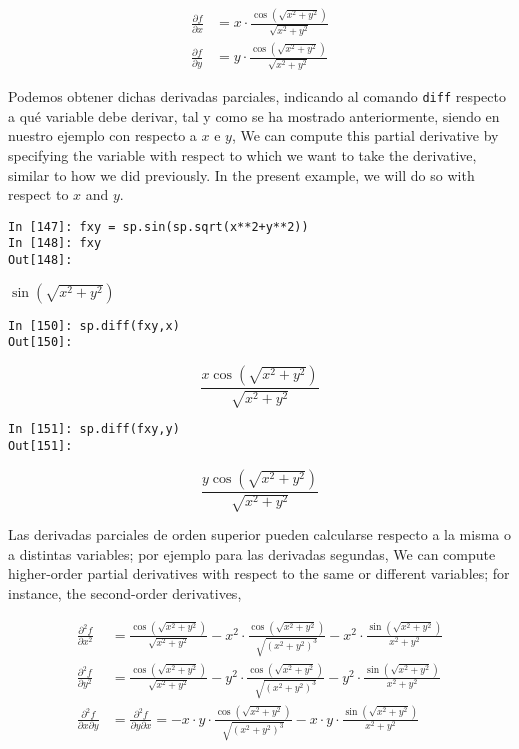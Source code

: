 \begin{align*}
\frac{\partial f}{\partial x} &= x\cdot\frac{\cos(\sqrt{x^2+y^2})}{\sqrt{x^2+y^2}} \\
\frac{\partial f}{\partial y} &= y\cdot\frac{\cos(\sqrt{x^2+y^2})}{\sqrt{x^2+y^2}}
\end{align*}
\begin{paracol}{2}
Podemos obtener dichas derivadas parciales, indicando al comando \texttt{diff} respecto a qué variable debe derivar, tal y como se ha mostrado anteriormente, siendo en nuestro ejemplo con respecto a $x$ e $y$,
\switchcolumn
We can compute this partial derivative by specifying the variable with respect to which we want to take the derivative, similar to how we did previously. In the present example, we will do so with respect to \(x\) and \(y\).  
\end{paracol}
\begin{center}
	\begin{minipage}{.5\textwidth}
		\begin{verbatim}
In [147]: fxy = sp.sin(sp.sqrt(x**2+y**2))
In [148]: fxy
Out[148]: 	
		\end{verbatim}
		$\sin(\sqrt{x^2+ y^2})$
		\begin{verbatim}
In [150]: sp.diff(fxy,x)
Out[150]: 
		\end{verbatim}
		\begin{equation*} \frac{x\cos(\sqrt{x^2+y^2})}{\sqrt{x^2+y^2}}\end{equation*}
		\begin{verbatim}
In [151]: sp.diff(fxy,y)
Out[151]:   
		\end{verbatim}
		\begin{equation*} \frac{y\cos(\sqrt{x^2+y^2})}{\sqrt{x^2+y^2}}\end{equation*}
	\end{minipage}
\end{center}

\begin{paracol}{2}
Las derivadas parciales de orden superior pueden calcularse respecto a la misma o a distintas variables; por ejemplo para las derivadas segundas,
\switchcolumn
We can compute higher-order partial derivatives with respect to the same or different variables; for instance, the second-order derivatives,
\end{paracol}
\begin{align*}
\frac{\partial^2f}{\partial x^2} &= \frac{\cos(\sqrt{x^2+y^2})}{\sqrt{x^2+y^2}} - 
x^2 \cdot \frac{\cos(\sqrt{x^2+y^2})}{\sqrt{(x^2+y^2)^3}} -
x^2 \cdot \frac{\sin(\sqrt{x^2+y^2})}{x^2+y^2} \\
\frac{\partial^2f}{\partial y^2} &= \frac{\cos(\sqrt{x^2+y^2})}{\sqrt{x^2+y^2}} - 
y^2 \cdot \frac{\cos(\sqrt{x^2+y^2})}{\sqrt{(x^2+y^2)^3}} -
y^2 \cdot \frac{\sin(\sqrt{x^2+y^2})}{x^2+y^2} \\
\frac{\partial^2f}{\partial x\partial y} &= \frac{\partial^2f}{\partial y\partial x} =-x\cdot y\cdot\frac{\cos(\sqrt{x^2+y^2})}{\sqrt{(x^2+y^2)^3}} - 
x\cdot y \cdot\frac{\sin(\sqrt{x^2+y^2})}{x^2+y^2} 
\end{align*}

